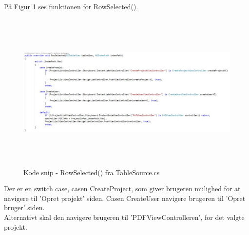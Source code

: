 På Figur \ref{fig:RowSelection} ses funktionen for RowSelected().
\begin{figure}[H] %
	\centering
	\includegraphics[height=8cm, width=17cm]{../ArkitekturDesign/Design/ProjectList/RowSelection}
	\caption{Kode snip - RowSelected() fra TableSource.cs}
	\label{fig:RowSelection}
\end{figure}
Der er en switch case, casen CreateProject, som giver brugeren mulighed for at navigere til 'Opret projekt' siden. Casen CreateUser navigere brugeren til 'Opret bruger' siden. \\
Alternativt skal den navigere brugeren til 'PDFViewControlleren', for det valgte projekt.

\clearpage
